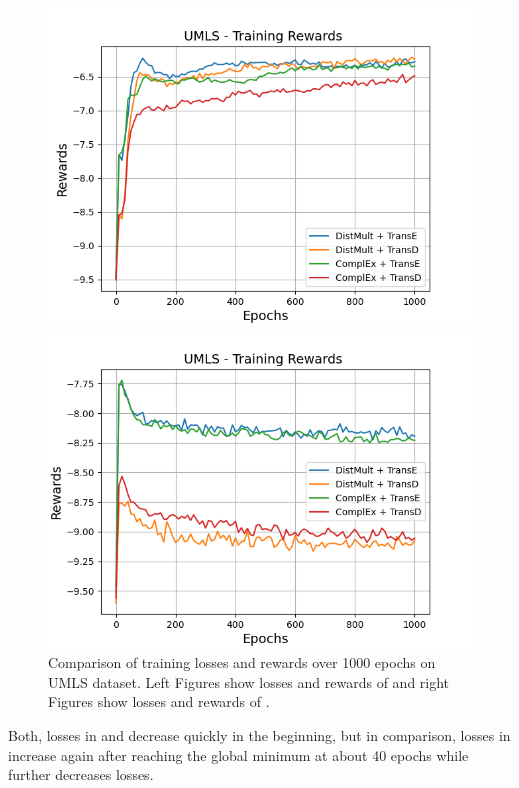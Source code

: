 \begin{figure}[H]
\begin{minipage}{.5\textwidth}
      \includegraphics[width=0.9\linewidth]{figures/results/gan_train/not_pretrained/random/umls/epochs1000/random_umls_rew.png}
    \end{minipage}%
    \begin{minipage}{.5\textwidth}
      \centering
      \includegraphics[width=0.9\linewidth]{figures/results/gan_train/not_pretrained/uncertainty/max_distribution/entropy/umls/1k_epochs/uncertainty_umls_rew.png}
    \end{minipage}%
    \caption{Comparison of training losses and rewards over 1000 epochs on \textsc{UMLS} dataset.
    Left Figures show losses and rewards of \origsampling and right Figures show losses and rewards of \ussoftmax.}
    \label{fig:advtrain_umls_losses_rewards}
\end{figure}
Both, losses in \origsampling and \ussoftmax decrease quickly in the beginning, but in comparison, losses in \origsampling increase again after reaching the global minimum at about 40 epochs while \ussoftmax further decreases losses.
